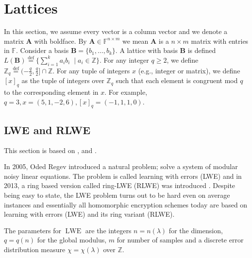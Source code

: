 \section{Lattices}\label{sec:lattices}

In this section, we assume every vector is a column vector and we denote a matrix $\textbf{A}$ with boldface. By $\textbf{A} \in \mathbb{F}^{n \times m}$ we mean $\textbf{A}$ is a $n \times m$ matrix with entries in $\mathbb{F}$. Consider a basis $\textbf{B} = \{b_1, \dots, b_k\}$. A lattice with basis $\textbf{B}$ is defined $L(\textbf{B}) \stackrel{\mathrm{def}}{=} \{ \sum_{i=1}^k a_i b_i \; \mid a_i \in \mathbb{Z}\}$. For any integer $q \geq 2$, we define $\mathbb{Z}_q \stackrel{\mathrm{def}}{=} (-\frac{q}{2}, \frac{q}{2}] \cap \mathbb{Z}$. For any tuple of integers $x$ (e.g., integer or matrix), we define $[x]_q$ as the tuple of integers over $\mathbb{Z}_q$ such that each element is congruent mod $q$ to the corresponding element in $x$. For example, $q = 3, x = (5,1,-2,6), [x]_q = (-1,1,1,0)$.

\subsection*{LWE and RLWE}\label{subsec:LWE}
This section is based on \cite{Hal18}, \cite{LNP22} and \cite{Pei16-decade}.

In 2005, Oded Regev introduced \cite{Reg05-LWE} a natural problem; solve a system of modular noisy linear equations. The problem is called learning with errors (LWE) and in 2013, a ring based version called ring-LWE (RLWE) was introduced \cite{RLWE}. Despite being easy to state, the LWE problem turns out to be hard even on average instances and essentially all homomorphic encryption schemes today are based on learning with errors (LWE) and its ring variant (RLWE).

The parameters for $\operatorname{LWE}$ are the integers $n = n(\lambda)$ for the dimension, $q = q(n)$ for the global modulus, $m$ for number of samples and a discrete error distribution measure $\chi = \chi(\lambda)$ over $\mathbb{Z}$.


